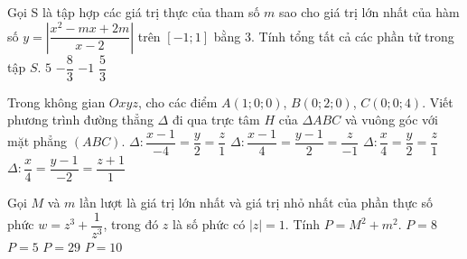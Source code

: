 \begin{ex}%
	Gọi S là tập hợp các giá trị thực của tham số $m$ sao cho giá trị lớn nhất của hàm số $y = \left|\dfrac{x^2-mx+2m}{x-2}\right|$
	trên $[-1; 1]$ bằng 3. Tính tổng tất cả các phần tử trong tập $S$.
	\choice
	{$5$ }
	{ $-\dfrac{8}{3}$}
	{\True $-1$}
	{ $\dfrac{5}{3}$}
\end{ex}
\begin{ex}%
	Trong không gian $Oxyz$, cho các điểm $A(1; 0; 0)$, $B(0; 2; 0)$, $C(0; 0; 4)$. Viết phương trình đường thẳng $\Delta$ đi qua trực tâm $H$ của $\Delta ABC$ và vuông góc với mặt phẳng $(ABC)$.
	\choice
	{ $\Delta: \dfrac{x-1}{-4}=\dfrac{y}{2}=\dfrac{z}{1}$}
	{ $\Delta: \dfrac{x-1}{4}=\dfrac{y-1}{2}=\dfrac{z}{-1}$}
	{\True $\Delta: \dfrac{x}{4}=\dfrac{y}{2}=\dfrac{z}{1}$}
	{ $\Delta: \dfrac{x}{4}=\dfrac{y-1}{-2}=\dfrac{z+1}{1}$}
\end{ex}
\begin{ex}%
	Gọi $M$ và $m $ lần lượt là giá trị lớn nhất và giá trị nhỏ nhất của phần thực số phức $w = z^3 + \dfrac{1}{z^3}$, trong đó $z$ là số phức có $|z| = 1$. Tính $P = M^2 + m^2$.
	\choice
	{\True $P=8$}
	{ $P=5$}
	{ $P=29$}
	{ $P=10$}
\end{ex}
